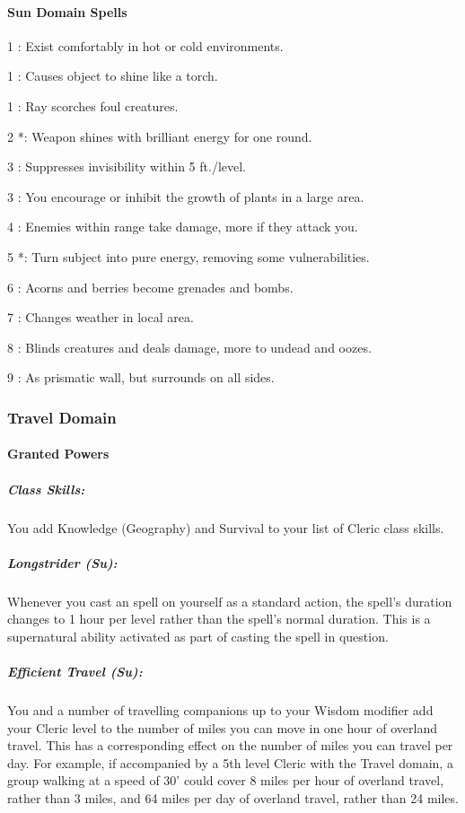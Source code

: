 \paragraph{Sun Domain Spells}
\begin{list}{}{\leftmargin=1em}
\item[1] : Exist comfortably in hot or cold environments.
\item[1] : Causes object to shine like a torch.
\item[1] : Ray scorches foul creatures.
\item[2] *: Weapon shines with brilliant energy for one round.
\item[3] : Suppresses invisibility within 5 ft./level.
\item[3] : You encourage or inhibit the growth of plants in a large area.
\item[4] : Enemies within range take damage, more if they attack you.
\item[5] *: Turn subject into pure energy, removing some vulnerabilities.
\item[6] : Acorns and berries become grenades and bombs.
\item[7] : Changes weather in local area.
\item[8] : Blinds creatures and deals damage, more to undead and oozes.
\item[9] : As prismatic wall, but surrounds on all sides.
\end{list}
\subsubsection{Travel Domain}
\paragraph{Granted Powers}
\subparagraph{Class Skills:} 
You add Knowledge (Geography) and Survival to your list of Cleric class skills.
\subparagraph{Longstrider (Su):}
Whenever you cast an  spell on yourself as a standard action, the spell's duration changes to 1 hour per level rather than the spell's normal duration.
This is a supernatural ability activated as part of casting the spell in question.
\subparagraph{Efficient Travel (Su):}
You and a number of travelling companions up to your Wisdom modifier add your Cleric level to the number of miles you can move in one hour of overland travel.
This has a corresponding effect on the number of miles you can travel per day.
For example, if accompanied by a 5th level Cleric with the Travel domain, a group walking at a speed of 30' could cover 8 miles per hour of overland travel, rather than 3 miles, and 64 miles per day of overland travel, rather than 24 miles.


